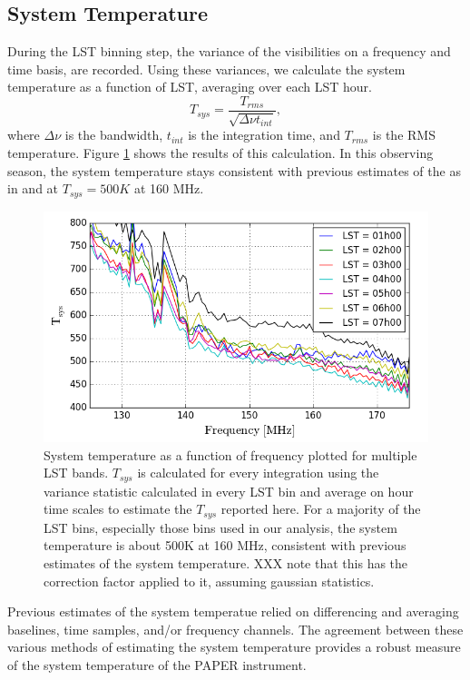 \documentclass[twocolumn,numberedappendix]{emulateapj} \shorttitle{PSA64}
\begin{document}
\subsection{System Temperature}   
During the LST binning step, the variance of the visibilities on a frequency and
time basis, are recorded. Using these variances, we calculate the system
temperature as a function of LST, averaging over each LST hour. 
\begin{equation}
    T_{sys} = \frac{T_{rms}}{\sqrt{\Delta\nu t_{int}}}, 
\end{equation}
where $\Delta\nu$ is the bandwidth, $t_{int}$ is the integration time, and
$T_{rms}$ is the RMS temperature.
Figure \ref{fig:tsys} shows the results of this calculation. In this observing
season, the system temperature stays consistent with previous estimates of the
as in \citet{parsons_et_al2014} and \citet{jacobs_et_al2014} at $T_{sys} =
500K$ at 160 MHz.

\begin{figure}[b!]\centering
\includegraphics[width=\columnwidth]{plots/tsys.png}
\caption{System temperature as a function of frequency plotted for multiple LST
bands. $T_{sys}$ is calculated for every integration using the variance
statistic calculated in every LST bin and average on hour time scales to
estimate the $T_{sys}$ reported here. For a majority of the LST bins, especially
those bins used in our analysis, the system temperature is about 500K at 160
MHz, consistent with previous estimates of the system temperature. XXX note that
this has the correction factor applied to it, assuming gaussian statistics.}
\label{fig:tsys}
\end{figure}
Previous estimates of the system temperatue
\citep{parsons_et_al2014,jacobs_et_al2014} relied on differencing and averaging
baselines, time samples, and/or frequency channels. The agreement between these
various methods of estimating the system temperature provides a robust measure
of the system temperature of the PAPER instrument. 
\end{document}

